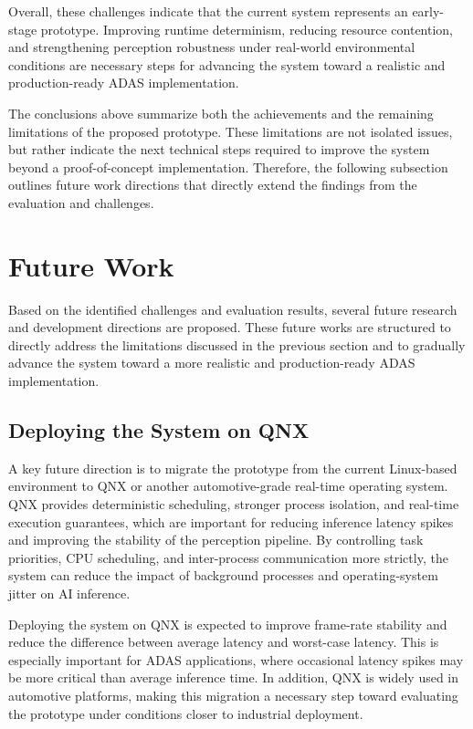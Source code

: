 Overall, these challenges indicate that the current system represents an early-stage prototype. Improving runtime determinism, reducing resource contention, and strengthening perception robustness under real-world environmental conditions are necessary steps for advancing the system toward a realistic and production-ready ADAS implementation.

The conclusions above summarize both the achievements and the remaining limitations of the proposed prototype. These limitations are not isolated issues, but rather indicate the next technical steps required to improve the system beyond a proof-of-concept implementation. Therefore, the following subsection outlines future work directions that directly extend the findings from the evaluation and challenges.


\section{Future Work}

Based on the identified challenges and evaluation results, several future research and development directions are proposed. These future works are structured to directly address the limitations discussed in the previous section and to gradually advance the system toward a more realistic and production-ready ADAS implementation.

\subsection{Deploying the System on QNX}

A key future direction is to migrate the prototype from the current Linux-based environment to QNX or another automotive-grade real-time operating system. QNX provides deterministic scheduling, stronger process isolation, and real-time execution guarantees, which are important for reducing inference latency spikes and improving the stability of the perception pipeline. By controlling task priorities, CPU scheduling, and inter-process communication more strictly, the system can reduce the impact of background processes and operating-system jitter on AI inference.

Deploying the system on QNX is expected to improve frame-rate stability and reduce the difference between average latency and worst-case latency. This is especially important for ADAS applications, where occasional latency spikes may be more critical than average inference time. In addition, QNX is widely used in automotive platforms, making this migration a necessary step toward evaluating the prototype under conditions closer to industrial deployment.

